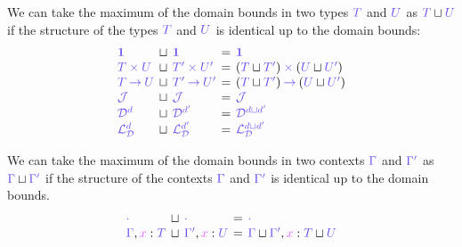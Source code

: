 \documentclass[main.tex]{subfiles}
\begin{document}
\begin{definition}[$\ty{T}\sqcup\ty{U}$]
  We can take the maximum of the domain bounds in two types $\ty{T}$ and $\ty{U}$ as $\ty{T}\sqcup\ty{U}$ if the structure of the types $\ty{T}$ and $\ty{U}$ is identical up to the domain bounds:
  \[
    \setlength{\arraycolsep}{2pt}
    \begin{array}{lclcl}
      \ty{\tyunit} & \sqcup & \ty{\tyunit}
      & = & \ty{\tyunit}
      \\
      \ty{\typrod{T}{U}} & \sqcup & \ty{\typrod{T'}{U'}}
      & = & \typrod{(\ty{T}\sqcup\ty{T'})}{(\ty{U}\sqcup\ty{U'})}
      \\
      \ty{\tyfun{T}{U}} & \sqcup & \ty{\tyfun{T'}{U'}}
      & = & \tyfun{(\ty{T}\sqcup\ty{T'})}{(\ty{U}\sqcup\ty{U'})}
      \\
      \tyJ & \sqcup & \tyJ
      & = & \tyJ
      \\
      \tyD{d} & \sqcup & \tyD{d'}
      & = & \tyD{{d}\sqcup{d'}}
      \\
      \tyL{d} & \sqcup & \tyL{d'}
      & = & \tyL{{d}\sqcup{d'}}
    \end{array}
  \]
\end{definition}

\begin{definition}
  We can take the maximum of the domain bounds in two contexts $\ty{\Gamma}$ and $\ty{\Gamma'}$ as $\ty{\Gamma}\sqcup\ty{\Gamma'}$ if the structure of the contexts $\ty{\Gamma}$ and $\ty{\Gamma'}$ is identical up to the domain bounds.
  \[
    \setlength{\arraycolsep}{2pt}
    \begin{array}{lclcl}
      \ty{\emptyenv} & \sqcup & \ty{\emptyenv}
      & = & \ty{\emptyenv}
      \\
      \ty{\Gamma},\tmty{x}{T} & \sqcup & \ty{\Gamma'},\tmty{x}{U}
      & = & \ty{\Gamma}\sqcup\ty{\Gamma'},\tm{x}:{\ty{T}\sqcup\ty{U}}
    \end{array}
  \]
\end{definition}
\end{document}
